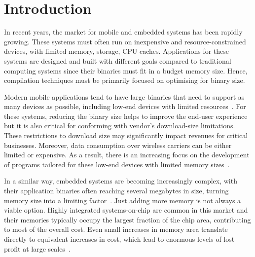
\chapter{Introduction}

In recent years, the market for mobile and embedded systems has been rapidly growing.
These systems must often run on inexpensive and resource-constrained devices, with limited memory, storage, CPU caches. %
Applications for these systems are designed and built with different goals compared to traditional computing systems since their binaries must fit in a budget memory size.
Hence, compilation techniques must be primarily focused on optimising for binary size.



Modern mobile applications tend to have large binaries that need to support as many devices as possible, including low-end devices with limited resources~\cite{hart02,etzo10}.
For these systems, reducing the binary size helps to improve the end-user experience but it is also critical for conforming with vendor's download-size limitations.
These restrictions to download size may significantly impact revenues for critical businesses.
Moreover, data consumption over wireless carriers can be either limited or expensive.
As a result, there is an increasing focus on the development of programs tailored for these low-end devices with limited memory sizes~\cite{androidGo,hahm16}.

In a similar way, embedded systems are becoming increasingly complex, with their application binaries often reaching several megabytes in size, turning memory size into a limiting factor~\cite{plaza18}.
Just adding more memory is not always a viable option.
Highly integrated systems-on-chip are common in this market and their memories typically occupy the largest fraction of the chip area, contributing to most of the overall cost.
Even small increases in memory area translate directly to equivalent increases in cost, which lead to enormous levels of lost profit at large scales~\cite{edler10}.

